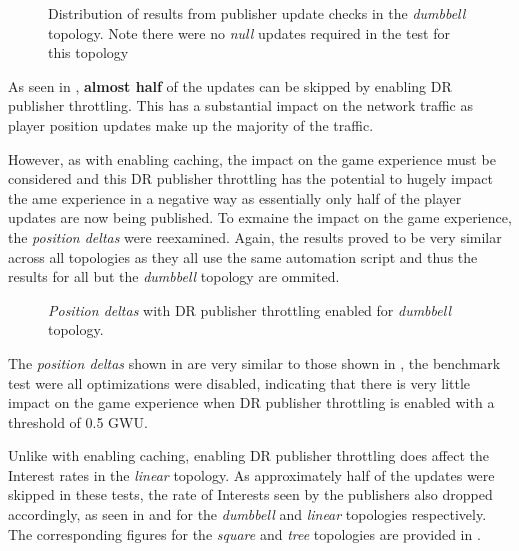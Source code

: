 \begin{figure}[H]
    \centering
    \caption{Distribution of results from publisher update checks in the \textit{dumbbell} topology. Note there were no \textit{null} updates required in the test for this topology}
    \label{fig:eval:caching:dr-pub-throt:counters:dumbbell}
\end{figure}

As seen in , \textbf{almost half} of the updates can be skipped by enabling DR publisher throttling. This has a substantial impact on the network traffic as player position updates make up the majority of the traffic.

However, as with enabling caching, the impact on the game experience must be considered and this DR publisher throttling has the potential to hugely impact the ame experience in a negative way as essentially only half of the player updates are now being published. To exmaine the impact on the game experience, the \textit{position deltas} were reexamined. Again, the results proved to be very similar across all topologies as they all use the same automation script and thus the results for all but the \textit{dumbbell} topology are ommited.

\begin{figure}[H]
    \centering
    \caption{\textit{Position deltas} with DR publisher throttling enabled for \textit{dumbbell} topology.}
    \label{fig:eval:caching:dr-pub-throt:pos-deltas:dumbbell}
\end{figure}

The \textit{position deltas} shown in  are very similar to those shown in , the benchmark test were all optimizations were disabled, indicating that there is very little impact on the game experience when DR publisher throttling is enabled with a threshold of 0.5 GWU.

Unlike with enabling caching, enabling DR publisher throttling does affect the Interest rates in the \textit{linear} topology. As approximately half of the updates were skipped in these tests, the rate of Interests seen by the publishers also dropped accordingly, as seen in  and  for the \textit{dumbbell} and \textit{linear} topologies respectively. The corresponding figures for the \textit{square} and \textit{tree} topologies are provided in .

